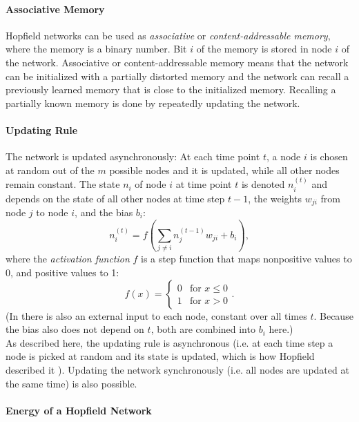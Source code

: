 \paragraph{Associative Memory}

Hopfield networks can be used as \emph{associative }or\emph{ content-addressable
memory},
where the memory is a binary number. Bit $i$ of the memory is stored
in node $i$ of the network. Associative or content-addressable memory
means that the network can be initialized with a partially distorted
memory and the network can recall a previously learned memory that
is close to the initialized memory. Recalling a partially known memory
is done by repeatedly updating the network.

\paragraph{Updating Rule}

The network is updated asynchronously: At each time point $t$, a
node $i$ is chosen at random out of the $m$ possible nodes and it
is updated, while all other nodes remain constant. The state $n_{i}$
of node $i$ at time point $t$ is denoted $n_{i}^{(t)}$ and depends
on the state of all other nodes at time step $t-1$, the weights $w_{ji}$
from node $j$ to node $i$, and the bias $b_{i}$: 
\[
n_{i}^{(t)}=f\left(\sum_{j\neq i}n_{j}^{(t-1)}w_{ji}+b_{i}\right),
\]
where the \emph{activation function} $f$
is a step function that maps nonpositive values to 0, and positive
values to 1: 
\[
f(x)=\begin{cases}
0 & \mbox{for }x\leq0\\
1 & \mbox{for }x>0
\end{cases}.
\]
(In \cite{Hopfield1984} there is also an external input to each
node, constant over all times $t$. Because the bias also does not
depend on $t$, both are combined into $b_{i}$ here.)\\
As described here, the updating rule is asynchronous (i.e. at each
time step a node is picked at random and its state is updated, which
is how Hopfield described it \cite{Hopfield1984}). Updating the
network synchronously (i.e. all nodes are updated at the same time)
is also possible.

\paragraph{Energy of a Hopfield Network}

